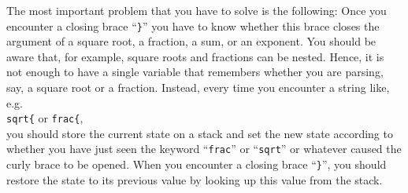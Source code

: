 \remarkEng
The most important problem that you have to solve is the following:  Once you encounter a closing brace
``\texttt{\}}'' you have to know whether this brace closes the argument of a square root, a
fraction, a sum, or an exponent.  You should be aware that, for example, square roots and fractions
can be nested.  Hence, it is not enough to have a single variable that remembers whether you are
parsing, say, a square root or a fraction.  Instead, every time you encounter a string like, e.g.
\\[0.2cm]
\hspace*{1.3cm}
\texttt{sqrt\{} \quad or \quad \texttt{frac\{},
\\[0.2cm]
you should store the current state on a stack and set the new state according to whether you have just seen the
keyword ``\texttt{frac}'' or ``\texttt{sqrt}'' or whatever caused the
curly brace to be opened.  When you encounter a closing brace ``\texttt{\}}'', you should 
restore the state to its previous value by looking up this value from the stack.  
\eox




